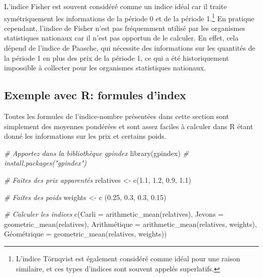 \documentclass[
]{article}
\newenvironment{Shaded}{\begin{snugshade}}{\end{snugshade}}
\newcommand{\AttributeTok}[1]{\textcolor[rgb]{0.77,0.63,0.00}{#1}}
\newcommand{\CommentTok}[1]{\textcolor[rgb]{0.56,0.35,0.01}{\textit{#1}}}
\newcommand{\FloatTok}[1]{\textcolor[rgb]{0.00,0.00,0.81}{#1}}
\newcommand{\FunctionTok}[1]{\textcolor[rgb]{0.00,0.00,0.00}{#1}}
\newcommand{\NormalTok}[1]{#1}
\newcommand{\OtherTok}[1]{\textcolor[rgb]{0.56,0.35,0.01}{#1}}
\begin{document}
L'indice Fisher est souvent considéré comme un indice idéal car il traite symétriquement les informations de la période 0 et de la période 1.\footnote{L'indice Törnqvist est également considéré comme idéal pour une raison similaire, et ces types d'indices sont souvent appelés superlatifs.} En pratique cependant, l'indice de Fisher n'est pas fréquemment utilisé par les organismes statistiques nationaux car il n'est pas opportun de le calculer. En effet, cela dépend de l'indice de Paasche, qui nécessite des informations sur les quantités de la période 1 en plus des prix de la période 1, ce qui a été historiquement impossible à collecter pour les organismes statistiques nationaux.

\hypertarget{exemple-avec-r-formules-dindex}{%
\subsection{Exemple avec R: formules d'index}\label{exemple-avec-r-formules-dindex}}

Toutes les formules de l'indice-nombre présentées dans cette section sont simplement des moyennes pondérées et sont assez faciles à calculer dans R étant donné les informations sur les prix et certains poids.

\begin{Shaded}
\begin{Highlighting}[]
\CommentTok{\# Apportez dans la bibliothèque gpindex}
\FunctionTok{library}\NormalTok{(gpindex) }\CommentTok{\# install.packages("gpindex")}

\CommentTok{\# Faites des prix apparentés}
\NormalTok{relatives }\OtherTok{\textless{}{-}} \FunctionTok{c}\NormalTok{(}\FloatTok{1.1}\NormalTok{, }\FloatTok{1.2}\NormalTok{, }\FloatTok{0.9}\NormalTok{, }\FloatTok{1.1}\NormalTok{)}

\CommentTok{\# Faites des poids}
\NormalTok{weights }\OtherTok{\textless{}{-}} \FunctionTok{c}\NormalTok{ (}\FloatTok{0.25}\NormalTok{, }\FloatTok{0.3}\NormalTok{, }\FloatTok{0.3}\NormalTok{, }\FloatTok{0.15}\NormalTok{)}

\CommentTok{\# Calculer les indices}
\FunctionTok{c}\NormalTok{(}\AttributeTok{Carli =} \FunctionTok{arithmetic\_mean}\NormalTok{(relatives),}
  \AttributeTok{Jevons =} \FunctionTok{geometric\_mean}\NormalTok{(relatives),}
\NormalTok{  Arithmétique }\OtherTok{=} \FunctionTok{arithmetic\_mean}\NormalTok{(relatives, weights),}
\NormalTok{  Géométrique }\OtherTok{=} \FunctionTok{geometric\_mean}\NormalTok{(relatives, weights))}
\end{Highlighting}
\end{Shaded}
\end{document}
